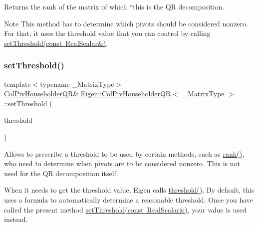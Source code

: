 \begin{DoxyReturn}{Returns}
the rank of the matrix of which $\ast$this is the QR decomposition.
\end{DoxyReturn}
\begin{DoxyNote}{Note}
This method has to determine which pivots should be considered nonzero. For that, it uses the threshold value that you can control by calling \mbox{\hyperlink{class_eigen_1_1_col_piv_householder_q_r_ae712cdc9f0e521cfc8061bee58ff55ee}{set\+Threshold(const Real\+Scalar\&)}}. 
\end{DoxyNote}
\mbox{\label{class_eigen_1_1_col_piv_householder_q_r_ae712cdc9f0e521cfc8061bee58ff55ee}} 
\subsubsection{\texorpdfstring{setThreshold()}{setThreshold()}\hspace{0.1cm}{\footnotesize\ttfamily [1/2]}}
{\footnotesize\ttfamily template$<$typename \+\_\+\+Matrix\+Type$>$ \\
\mbox{\hyperlink{class_eigen_1_1_col_piv_householder_q_r}{Col\+Piv\+Householder\+QR}}\& \mbox{\hyperlink{class_eigen_1_1_col_piv_householder_q_r}{Eigen\+::\+Col\+Piv\+Householder\+QR}}$<$ \+\_\+\+Matrix\+Type $>$\+::set\+Threshold (\begin{DoxyParamCaption}\item[{const Real\+Scalar \&}]{threshold }\end{DoxyParamCaption})\hspace{0.3cm}{\ttfamily [inline]}}

Allows to prescribe a threshold to be used by certain methods, such as \mbox{\hyperlink{class_eigen_1_1_col_piv_householder_q_r_a2a59aaa689613ce5ef0c9130ad33940e}{rank()}}, who need to determine when pivots are to be considered nonzero. This is not used for the QR decomposition itself.

When it needs to get the threshold value, Eigen calls \mbox{\hyperlink{class_eigen_1_1_col_piv_householder_q_r_a72276adb1aa11f870f50d0bd58af014d}{threshold()}}. By default, this uses a formula to automatically determine a reasonable threshold. Once you have called the present method \mbox{\hyperlink{class_eigen_1_1_col_piv_householder_q_r_ae712cdc9f0e521cfc8061bee58ff55ee}{set\+Threshold(const Real\+Scalar\&)}}, your value is used instead.


